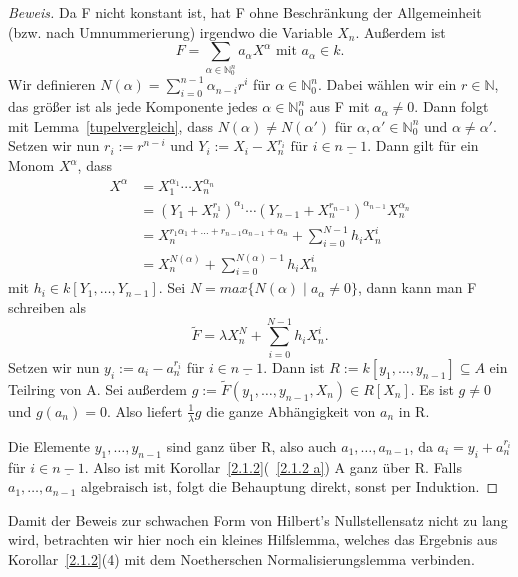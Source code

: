 \documentclass{article}
\begin{document}
\begin{proof}[Beweis]
	Da F nicht konstant ist, hat F ohne Beschränkung der Allgemeinheit (bzw.
	nach Umnummerierung) irgendwo die Variable \(X_n\). Außerdem ist
	\begin{displaymath} F = \sum_{\alpha \in \mathbb{N}^n_0} a_{\alpha}X^{\alpha}
	\text{ mit } a_{\alpha}\in k.\end{displaymath}
	Wir definieren \(N(\alpha) = \sum^{n-1}_{i=0} \alpha_{n-i}r^i\) für
	\(\alpha \in \mathbb{N}^n_0\). Dabei wählen wir ein \(r \in \mathbb{N}\),
	das größer ist als jede Komponente jedes \(\alpha \in \mathbb{N}^n_0\) aus F
	mit \(a_{\alpha} \neq 0\). Dann folgt mit Lemma~\ref{tupelvergleich}, dass
	\(N(\alpha) \neq N(\alpha')\) für \(\alpha, \alpha' \in \mathbb{N}^n_0\) und
	\(\alpha \neq \alpha'\). Setzen wir nun
	\( r_i := r^{n-i} \text{ und } Y_i := X_i - X_n^{r_i}
	\text{ für } i \in \underline{n-1}\). Dann gilt für ein Monom \(X^{\alpha}\),
	dass \begin{align*}
	X^{\alpha} &= X_1^{\alpha_1}\cdots X_{n}^{\alpha_n} \\
	&= (Y_1 + X_n^{r_1})^{\alpha_1} \cdots (Y_{n-1} + X_n^{r_{n-1}})^{\alpha_{n-1}}X_n^{\alpha_n} \\
	&= X_n^{r_1\alpha_1 + \ldots + r_{n-1}\alpha_{n-1} + \alpha_n} + \sum_{i=0}^{N-1} h_iX_n^i \\
	&= X_n^{N(\alpha)} + \sum_{i=0}^{N(\alpha)-1} h_iX_n^i
	\end{align*}
	mit \(h_i \in k[Y_1, \ldots, Y_{n-1}]\). Sei \(N = max\{N(\alpha)\;|\;a_{\alpha}
	\neq 0\}\), dann kann man F schreiben als
	\begin{displaymath} \tilde{F} = \lambda X_n^N + \sum_{i=0}^{N-1} h_iX_n^i.
	\end{displaymath}
	Setzen wir nun \(y_i := a_i - a_n^{r_i}\) für \(i \in \underline{n-1}\).
	Dann ist \(R := k[y_1,\ldots,y_{n-1}] \subseteq A\) ein Teilring von A.
	Sei außerdem \(g := \tilde{F}(y_1,\ldots,y_{n-1},X_n) \in R[X_n]\).
	Es ist \(g \neq 0\) und \(g(a_n) = 0\). Also liefert \(\frac{1}{\lambda}g\)
	die ganze Abhängigkeit von \(a_n\) in R.

	Die Elemente \(y_1,\ldots,y_{n-1}\) sind ganz über R, also auch \(a_1,\ldots,
	a_{n-1}\), da \(a_i = y_i + a_n^{r_i}\) für \(i \in \underline{n-1}\).
	Also ist mit Korollar~\ref{2.1.2}(~\ref{2.1.2 a}) A ganz über R. Falls
	\(a_1,\ldots,a_{n-1}\) algebraisch ist, folgt die Behauptung direkt, sonst
	per Induktion.
	\end{proof}
	
	Damit der Beweis zur schwachen Form von Hilbert's Nullstellensatz nicht
	zu lang wird, betrachten wir hier noch ein kleines Hilfslemma, welches das
	Ergebnis aus Korollar~\ref{2.1.2}(4) mit dem Noetherschen Normalisierungslemma verbinden.
\end{document}
